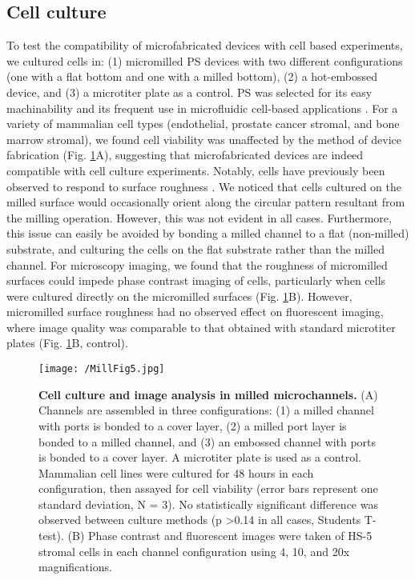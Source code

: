 \subsection{Cell culture}
To test the compatibility of microfabricated devices with cell based experiments, we cultured cells in: (1) micromilled PS devices with two different configurations (one with a flat bottom and one with a milled bottom), (2) a hot-embossed device, and (3) a microtiter plate as a control. PS was selected for its easy machinability and its frequent use in microfluidic cell-based applications \cite{Berthier2012, Berthier2013}. For a variety of mammalian cell types (endothelial, prostate cancer stromal, and bone marrow stromal), we found cell viability was unaffected by the method of device fabrication (Fig. \ref{figure:MillFig5}A), suggesting that microfabricated devices are indeed compatible with cell culture experiments. Notably, cells have previously been observed to respond to surface roughness \cite{Anselme2010, Kieswetter1996, Hatano1999, Deligianni2001, Xu2004, Mustafa2005, Anselme2010, Dowling2011, Gittens2011}. We noticed that cells cultured on the milled surface would occasionally orient along the circular pattern resultant from the milling operation. However, this was not evident in all cases. Furthermore, this issue can easily be avoided by bonding a milled channel to a flat (non-milled) substrate, and culturing the cells on the flat substrate rather than the milled channel. For microscopy imaging, we found that the roughness of micromilled surfaces could impede phase contrast imaging of cells, particularly when cells were cultured directly on the micromilled surfaces (Fig. \ref{figure:MillFig5}B). However, micromilled surface roughness had no observed effect on fluorescent imaging, where image quality was comparable to that obtained with standard microtiter plates (Fig. \ref{figure:MillFig5}B, control).

\begin{figure}[h!] %
\centering
\texttt{[image: /MillFig5.jpg]}
\caption[\textbf{Cell culture and image analysis in milled microchannels.}]{\textbf{Cell culture and image analysis in milled microchannels.} (A) Channels are assembled in three configurations: (1) a milled channel with ports is bonded to a cover layer, (2) a milled port layer is bonded to a milled channel, and (3) an embossed channel with ports is bonded to a cover layer. A microtiter plate is used as a control. Mammalian cell lines were cultured for 48 hours in each configuration, then assayed for cell viability (error bars represent one standard deviation, N = 3). No statistically significant difference was observed between culture methods (p \textgreater 0.14 in all cases, Students T-test). (B) Phase contrast and fluorescent images were taken of HS-5 stromal cells in each channel configuration using 4, 10, and 20x magnifications.}
\label{figure:MillFig5}
\end{figure}


